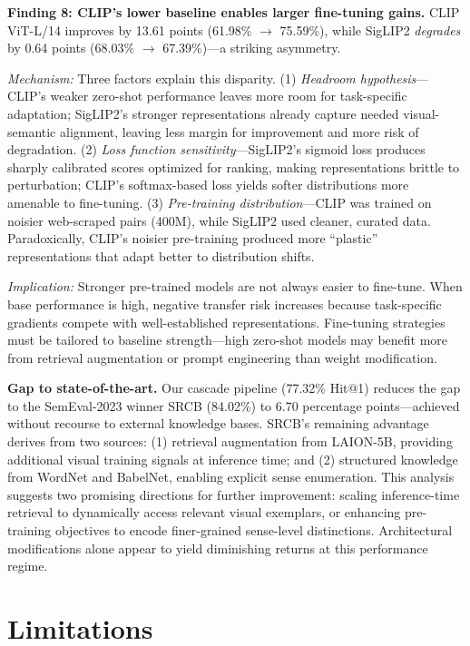 \documentclass[11pt]{article}
\begin{document}
\textbf{Finding 8: CLIP's lower baseline enables larger fine-tuning gains.}
CLIP ViT-L/14 improves by 13.61 points (61.98\% $\rightarrow$ 75.59\%), while SigLIP2 \textit{degrades} by 0.64 points (68.03\% $\rightarrow$ 67.39\%)---a striking asymmetry.

\textit{Mechanism:} Three factors explain this disparity. (1) \textit{Headroom hypothesis}---CLIP's weaker zero-shot performance leaves more room for task-specific adaptation; SigLIP2's stronger representations already capture needed visual-semantic alignment, leaving less margin for improvement and more risk of degradation. (2) \textit{Loss function sensitivity}---SigLIP2's sigmoid loss produces sharply calibrated scores optimized for ranking, making representations brittle to perturbation; CLIP's softmax-based loss yields softer distributions more amenable to fine-tuning. (3) \textit{Pre-training distribution}---CLIP was trained on noisier web-scraped pairs (400M), while SigLIP2 used cleaner, curated data. Paradoxically, CLIP's noisier pre-training produced more ``plastic'' representations that adapt better to distribution shifts.

\textit{Implication:} Stronger pre-trained models are not always easier to fine-tune. When base performance is high, negative transfer risk increases because task-specific gradients compete with well-established representations. Fine-tuning strategies must be tailored to baseline strength---high zero-shot models may benefit more from retrieval augmentation or prompt engineering than weight modification.

\textbf{Gap to state-of-the-art.} Our cascade pipeline (77.32\% Hit@1) reduces the gap to the SemEval-2023 winner SRCB (84.02\%) to 6.70 percentage points---achieved without recourse to external knowledge bases. SRCB's remaining advantage derives from two sources: (1) retrieval augmentation from LAION-5B, providing additional visual training signals at inference time; and (2) structured knowledge from WordNet and BabelNet, enabling explicit sense enumeration. This analysis suggests two promising directions for further improvement: scaling inference-time retrieval to dynamically access relevant visual exemplars, or enhancing pre-training objectives to encode finer-grained sense-level distinctions. Architectural modifications alone appear to yield diminishing returns at this performance regime.

\section{Limitations}
\label{sec:limitations}
\end{document}
